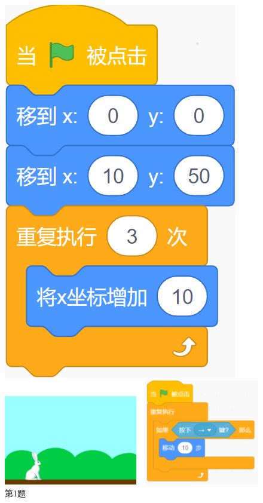 \documentclass[10pt, a4paper]{article}
\begin{document}
\begin{enumerate}
        \begin{figure}[htbp]
            \centering
            \begin{minipage}[t]{.1\textwidth}
                \centering
                \includegraphics[width=\textwidth]{1.png}
                \caption*{第1题}
            \end{minipage}
            \begin{minipage}[t]{.35\textwidth}
                \centering
                \includegraphics[width=\textwidth]{2.png}

\end{minipage}
\end{figure}
\end{enumerate}
\end{document}
